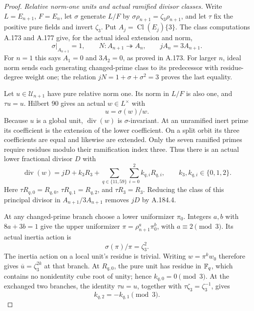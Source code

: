 \begin{proof}
\emph{Relative norm-one units and actual ramified divisor classes.}
Write \(L=E_{n+1}\), \(F=E_n\), let \(\sigma\)
generate \(L/F\) by \(\sigma\rho_{n+1}=\zeta_3\rho_{n+1}\),
and let \(\tau\) fix the positive pure fields and invert
\(\zeta_3\).  Put \(A_j=\operatorname{Cl}(E_j)\{3\}\).
The class computations A.173 and A.177 give, for the actual
ideal extension and norm,
\[
 \sigma|_{A_{n+1}}=1,\qquad
 N:A_{n+1}\twoheadrightarrow A_n,\qquad
 jA_n=3A_{n+1}.
\tag{A.184.4}
\]
For \(n=1\) this says \(A_1=0\) and \(3A_2=0\),
as proved in A.173.  For larger \(n\), ideal norm sends
each generating changed-prime class to its predecessor
with residue-degree weight one; the relation
\(jN=1+\sigma+\sigma^2=3\) proves the last equality.

Let \(u\in\mathcal U_{n+1}\) have pure relative norm
one.  Its norm in \(L/F\) is also one, and \(\tau u=u\).
Hilbert 90 gives an actual \(w\in L^\times\) with
\[
                         u=\sigma(w)/w.
\tag{A.184.5}
\]
Because \(u\) is a global unit, \(\operatorname{div}(w)\)
is \(\sigma\)-invariant.  At an unramified inert prime its
coefficient is the extension of the lower coefficient.  On
a split orbit its three coefficients are equal and likewise
are extended.  Only the seven ramified primes require residues
modulo their ramification index three.  Thus there is an
actual lower fractional divisor \(D\) with
\[
 \operatorname{div}(w)=jD+k_3R_3+
             \sum_{q\in\{11,59\}}\sum_{i=0}^2 k_{q,i}R_{q,i},
 \qquad k_3,k_{q,i}\in\{0,1,2\}.
\tag{A.184.6}
\]
Here \(\tau R_{q,0}=R_{q,0}\),
\(\tau R_{q,1}=R_{q,2}\), and \(\tau R_3=R_3\).
Reducing the class of this principal divisor in
\(A_{n+1}/3A_{n+1}\) removes \(jD\) by A.184.4.

At any changed-prime branch choose a lower uniformizer
\(\pi_0\).  Integers \(a,b\) with \(8a+3b=1\)
give the upper uniformizer
\(\pi=\rho_{n+1}^{a}\pi_0^b\), with
\(a\equiv2\pmod3\).  Its actual inertia action is
\[
                         \sigma(\pi)/\pi=\zeta_3^2.
\tag{A.184.7}
\]
The inertia action on a local unit's residue is trivial.
Writing \(w=\pi^k w_0\) therefore gives
\(\overline u=\zeta_3^{2k}\) at that branch.
At \(R_{q,0}\), the pure unit has residue in \(\mathbb F_q\),
which contains no nonidentity cube root of unity; hence
\(k_{q,0}=0\pmod3\).  At the exchanged two branches,
the identity \(\tau u=u\), together with
\(\tau\zeta_3=\zeta_3^{-1}\), gives
\[
                    k_{q,2}=-k_{q,1}\pmod3.
\tag{A.184.8}
\]


\end{proof}
